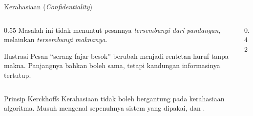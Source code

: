 \documentclass[aspectratio=169,11pt]{beamer}
\begin{document}
\begin{frame}{Kerahasiaan (\textit{Confidentiality})}
    \begin{columns}[T,onlytextwidth]
        \begin{column}{0.55\textwidth}
            Masalah ini tidak menuntut pesannya \emph{tersembunyi dari pandangan},
            melainkan \emph{tersembunyi maknanya}.
            \vspace{0.2cm}
            \begin{exampleblock}{Ilustrasi}
                Pesan ``serang fajar besok'' berubah menjadi rentetan huruf tanpa
                makna. Panjangnya bahkan boleh sama, tetapi kandungan informasinya
                tertutup.
            \end{exampleblock}
        \end{column}
        \begin{column}{0.42\textwidth}
            \centering
        \end{column}
    \end{columns}
    \vspace{0.25cm}
    \begin{alertblock}{Prinsip Kerckhoffs}
        Kerahasiaan tidak boleh bergantung pada kerahasiaan algoritma. Musuh
        mengenal sepenuhnya sistem yang dipakai, dan .
    \end{alertblock}
\end{frame}
\end{document}
